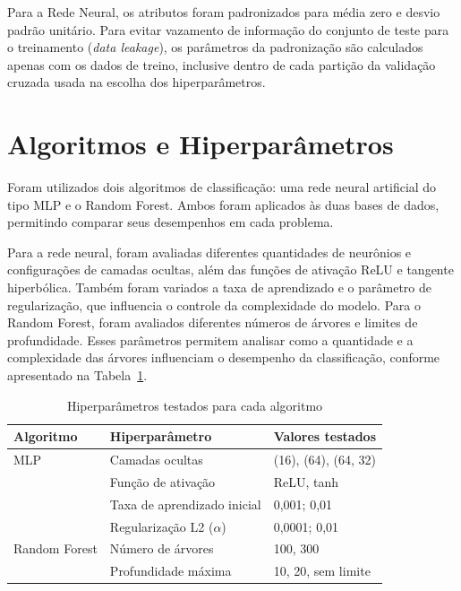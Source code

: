 \documentclass[12pt, oneside, a4paper, english, brazilian]{abntex2}
\begin{document}
Para a Rede Neural, os atributos foram padronizados para média zero e desvio padrão unitário. Para evitar vazamento de informação do conjunto de teste para o treinamento (\textit{data leakage}), os parâmetros da padronização são calculados apenas com os dados de treino, inclusive dentro de cada partição da validação cruzada usada na escolha dos hiperparâmetros.

\section{Algoritmos e Hiperparâmetros}

Foram utilizados dois algoritmos de classificação: uma rede neural artificial do tipo MLP e o Random Forest. Ambos foram aplicados às duas bases de dados, permitindo comparar seus desempenhos em cada problema.

Para a rede neural, foram avaliadas diferentes quantidades de neurônios e configurações de camadas ocultas, além das funções de ativação ReLU e tangente hiperbólica. Também foram variados a taxa de aprendizado e o parâmetro de regularização, que influencia o controle da complexidade do modelo. Para o Random Forest, foram avaliados diferentes números de árvores e limites de profundidade. Esses parâmetros permitem analisar como a quantidade e a complexidade das árvores influenciam o desempenho da classificação, conforme apresentado na Tabela~\ref{tab:hiperparametros-testados}.

\begin{table}[H]
  \centering
  \caption{Hiperparâmetros testados para cada algoritmo}
  \label{tab:hiperparametros-testados}
  \begin{tabular}{lll}
    \toprule
    Algoritmo & Hiperparâmetro & Valores testados \\
    \midrule
    MLP & Camadas ocultas & (16), (64), (64, 32) \\
        & Função de ativação & ReLU, tanh \\
        & Taxa de aprendizado inicial & 0,001; 0,01 \\
        & Regularização L2 ($\alpha$) & 0,0001; 0,01 \\
    \midrule
    Random Forest & Número de árvores & 100, 300 \\
                  & Profundidade máxima & 10, 20, sem limite \\
    \bottomrule
  \end{tabular}
\end{table}
\end{document}
